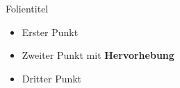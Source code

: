 \begin{frame}{Folientitel}
    \begin{itemize}
        \setlength{\itemsep}{0.8em}
        \item Erster Punkt
        \item Zweiter Punkt mit \textbf{Hervorhebung}
        \item Dritter Punkt
    \end{itemize}
\end{frame}
